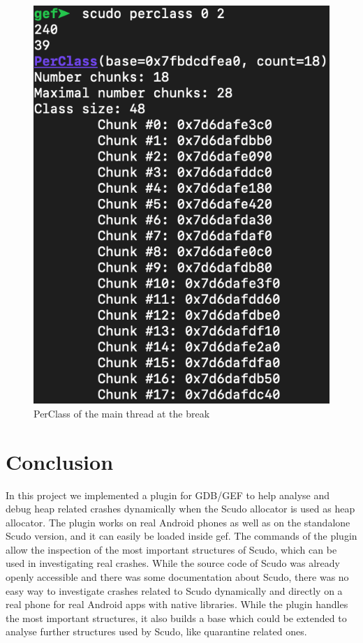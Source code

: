 \documentclass[a4paper,11pt,oneside]{report}
\begin{document}
\begin{figure}[h!]
  \centering
  \includegraphics[width=.5\linewidth]{figures/ScudoSmartbillBT13PerClassAfter.png}
  \caption{PerClass of the main thread at the break}
  \label{fig:ScudoSmartbillBT13PerClassAfter}
\end{figure}



\chapter{Conclusion}

In this project we implemented a plugin for GDB/GEF to help analyse and debug
heap related crashes dynamically when the Scudo allocator is used as heap allocator.
The plugin works on real Android phones as well as on the standalone Scudo
version, and it can easily be loaded inside gef. The commands of the plugin
allow the inspection of the most important structures of Scudo, which can
be used in investigating real crashes. While the source code of Scudo was
already openly accessible and there was some documentation about Scudo, there
was no easy way to investigate crashes related to Scudo dynamically and directly
on a real phone for real Android apps with native libraries. While the plugin
handles the most important structures, it also builds a base which could be
extended to analyse further structures used by Scudo, like quarantine related ones.

\cleardoublepage{}
\printbibliography{}
\end{document}
